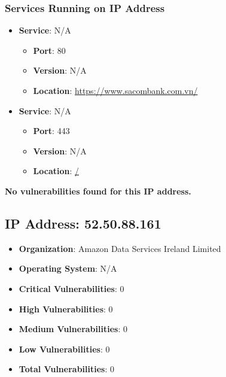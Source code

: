 \documentclass{article}
\begin{document}
\subsubsection*{Services Running on IP Address}

\begin{itemize}
    
        \item \textbf{Service}: N/A
        \begin{itemize}
            \item \textbf{Port}: 80
            \item \textbf{Version}:  N/A 
            \item \textbf{Location}: \href{ https://www.sacombank.com.vn/ }{ https://www.sacombank.com.vn/ }
        \end{itemize}
    
        \item \textbf{Service}: N/A
        \begin{itemize}
            \item \textbf{Port}: 443
            \item \textbf{Version}:  N/A 
            \item \textbf{Location}: \href{ / }{ / }
        \end{itemize}
    
\end{itemize}


\textbf{No vulnerabilities found for this IP address.}




\clearpage



\subsection{IP Address: 52.50.88.161}

\begin{itemize}
    \item \textbf{Organization}: Amazon Data Services Ireland Limited
    \item \textbf{Operating System}:  N/A 
    \item \textbf{Critical Vulnerabilities}: 0
    \item \textbf{High Vulnerabilities}: 0
    \item \textbf{Medium Vulnerabilities}: 0
    \item \textbf{Low Vulnerabilities}: 0
    \item \textbf{Total Vulnerabilities}: 0
\end{itemize}
\end{document}
